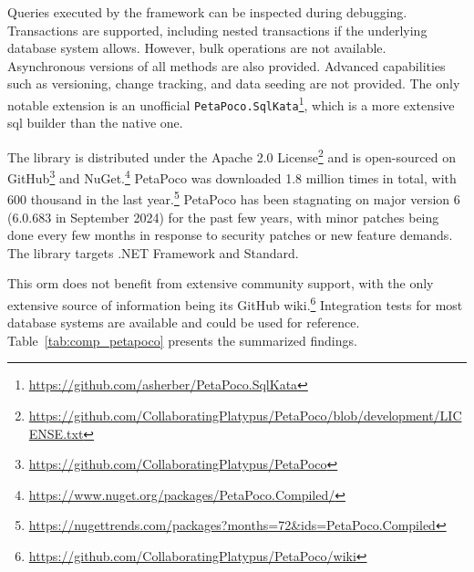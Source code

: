 Queries executed by the framework can be inspected during debugging. Transactions are supported, including nested transactions if the underlying database system allows. However, bulk operations are not available. Asynchronous versions of all methods are also provided. Advanced capabilities such as versioning, change tracking, and data seeding are not provided. The only notable extension is an unofficial \texttt{PetaPoco.SqlKata}\footnote{\url{https://github.com/asherber/PetaPoco.SqlKata}}, which is a more extensive \acrshort{sql} builder than the native one.

The library is distributed under the Apache 2.0 License\footnote{\url{https://github.com/CollaboratingPlatypus/PetaPoco/blob/development/LICENSE.txt}} and is open-sourced on GitHub\footnote{\url{https://github.com/CollaboratingPlatypus/PetaPoco}} and NuGet.\footnote{\url{https://www.nuget.org/packages/PetaPoco.Compiled/}} PetaPoco was downloaded 1.8 million times in total, with 600 thousand in the last year.\footnote{\url{https://nugettrends.com/packages?months=72&ids=PetaPoco.Compiled}} PetaPoco has been stagnating on major version 6 (6.0.683 in September 2024) for the past few years, with minor patches being done every few months in response to security patches or new feature demands. The library targets .NET Framework and Standard.

This \acrshort{orm} does not benefit from extensive community support, with the only extensive source of information being its GitHub wiki.\footnote{\url{https://github.com/CollaboratingPlatypus/PetaPoco/wiki}} Integration tests for most database systems are available and could be used for reference. Table~\ref{tab:comp_petapoco} presents the summarized findings.

